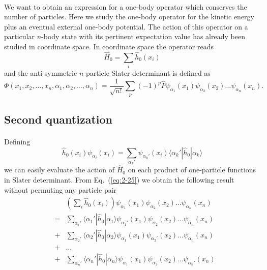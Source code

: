 \documentclass[%
twoside,                 %
final,                   %
10pt]{article}
\begin{document}
\paragraph{}
We want to obtain an expression for a one-body operator which conserves the number of particles.
Here we study the one-body operator for the kinetic energy plus an eventual external one-body potential.
The action of this operator on a particular $n$-body state with its pertinent expectation value has already
been studied in coordinate  space.
In coordinate space the operator reads
\begin{equation}
	\hat{H}_0 = \sum_i \hat{h}_0(x_i) \label{eq:2-23}
\end{equation}
and the anti-symmetric $n$-particle Slater determinant is defined as 
\[
\Phi(x_1, x_2,\dots ,x_n,\alpha_1,\alpha_2,\dots, \alpha_n)= \frac{1}{\sqrt{n!}} \sum_p (-1)^p\hat{P}\psi_{\alpha_1}(x_1)\psi_{\alpha_2}(x_2) \dots \psi_{\alpha_n}(x_n).
\]




\subsection{Second quantization}

\paragraph{}
Defining
\begin{equation}
	\hat{h}_0(x_i) \psi_{\alpha_i}(x_i) = \sum_{\alpha_k'} \psi_{\alpha_k'}(x_i) \langle\alpha_k'|\hat{h}_0|\alpha_k\rangle \label{eq:2-25}
\end{equation}
we can easily  evaluate the action of $\hat{H}_0$ on each product of one-particle functions in Slater determinant.
From Eq.~(\ref{eq:2-25})  we obtain the following result without  permuting any particle pair 
\begin{eqnarray}
	&& \left( \sum_i \hat{h}_0(x_i) \right) \psi_{\alpha_1}(x_1)\psi_{\alpha_2}(x_2) \dots \psi_{\alpha_n}(x_n) \nonumber \\
	& =&\sum_{\alpha_1'} \langle \alpha_1'|\hat{h}_0|\alpha_1\rangle 
		\psi_{\alpha_1'}(x_1)\psi_{\alpha_2}(x_2) \dots \psi_{\alpha_n}(x_n) \nonumber \\
	&+&\sum_{\alpha_2'} \langle \alpha_2'|\hat{h}_0|\alpha_2\rangle
		\psi_{\alpha_1}(x_1)\psi_{\alpha_2'}(x_2) \dots \psi_{\alpha_n}(x_n) \nonumber \\
	&+& \dots \nonumber \\
	&+&\sum_{\alpha_n'} \langle \alpha_n'|\hat{h}_0|\alpha_n\rangle
		\psi_{\alpha_1}(x_1)\psi_{\alpha_2}(x_2) \dots \psi_{\alpha_n'}(x_n) \label{eq:2-26}
\end{eqnarray}
\end{document}
